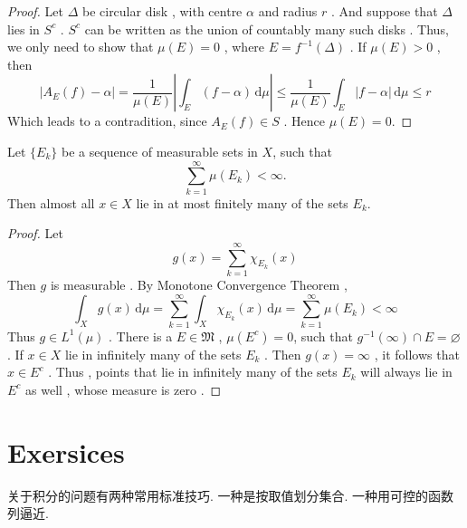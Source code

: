 \documentclass[../main.tex]{subfiles}
\begin{document}
\begin{proof}
Let \(   \Delta   \) be circular disk , with  centre \(  \alpha    \) and radius \(  r  \) .  And suppose that \(   \Delta   \) lies in \(  S^{c}  \) .  \(  S^{c}  \) can be written as the union of  countably many such disks . Thus, we only need to show that  \(  \mu \left( E \right)= 0    \) , where \(  E = f^{-1} \left(  \Delta  \right)   \) . If \(  \mu \left( E \right)> 0   \) , then \[
\left| A_{E}\left( f \right)-\alpha   \right| = \frac{1 }{\mu \left( E \right)  }\left| \int_{E}\left( f- \alpha  \right)\,\mathrm{d} \mu   \right|\le \frac{1 }{\mu \left( E \right)  } \int_{E}\left| f-\alpha  \right|\,\mathrm{d} \mu \le r     
\] Which leads to a contradition,  since  \(  A_{E}\left( f \right) \in S   \)  .  Hence \(  \mu \left( E \right)= 0   \).  
\end{proof}

\begin{theorem}{}{}
Let $\{E_k\}$ be a sequence of measurable sets in $X$, such that
\[
\sum_{k=1}^{\infty} \mu(E_k) < \infty.
\]
Then almost all $x \in X$ lie in at most finitely many of the sets $E_k$.
\end{theorem}
\begin{proof}
     Let \[
     g\left( x \right)=  \sum _{k = 1}^{\infty}\chi _{E_{k}}\left( x \right)  
     \] Then \(  g   \) is measurable .  By Monotone Convergence Theorem ,  \[
     \int_{X}g\left( x \right)\,\mathrm{d} \mu =  \sum _{k = 1}^{\infty} \int_{X} \chi _{E_{k}}\left( x \right)\,\mathrm{d} \mu =   \sum _{k = 1}^{\infty} \mu \left( E_{k} \right)< \infty   
     \]  Thus \(  g\in L^{1}\left( \mu  \right)   \) . There is a \(  E \in \mathfrak{M}  \) , \(  \mu \left( E^{c} \right)= 0    \),   such that  \(  g^{-1} \left( \infty \right)\cap E= \varnothing    \)  .   If \(  x \in X  \) lie in infinitely many of the sets \(  E_{k}  \) .  Then \(  g\left( x \right)= \infty   \)  , it follows that  \(  x \in E^{c}  \) . Thus , points that lie in infinitely many of the sets \(  E_{k}  \)  will always lie in \(  E^{c}  \) as well , whose measure is zero .
\end{proof}


\section{Exersices}

\begin{note}
    关于积分的问题有两种常用标准技巧. 一种是按取值划分集合. 一种用可控的函数列逼近. 
\end{note}
\end{document}
